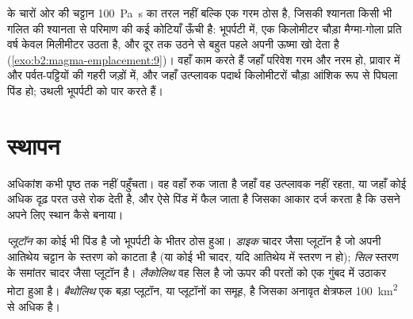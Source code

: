  के चारों ओर की चट्टान \qty{100}{Pa.s} का तरल नहीं बल्कि एक गरम ठोस है,
जिसकी श्यानता किसी भी गलित की श्यानता से परिमाण की कई कोटियाँ ऊँची है:
भूपर्पटी में, एक किलोमीटर चौड़ा मैग्मा-गोला प्रति वर्ष केवल मिलीमीटर उठता है, और
दूर तक उठने से बहुत पहले अपनी ऊष्मा खो देता है (\cref{exo:b2:magma-emplacement:9})। 
वहाँ काम करते हैं जहाँ परिवेश गरम और नरम हो, प्रावार में और पर्वत-पट्टियों की गहरी
जड़ों में, और जहाँ उत्प्लावक पदार्थ किलोमीटरों चौड़ा आंशिक रूप से पिघला पिंड हो;
उथली भूपर्पटी को  पार करते हैं।

\section{स्थापन}

अधिकांश  कभी पृष्ठ तक नहीं पहुँचता। वह वहाँ रुक जाता है जहाँ वह उत्प्लावक नहीं रहता,
या जहाँ कोई अधिक दृढ़ परत उसे रोक देती है, और ऐसे पिंड में फैल जाता है जिसका आकार
दर्ज करता है कि उसने अपने लिए स्थान कैसे बनाया।

\begin{definition}[अंतर्वेधी पिंड]\label{def:b2:magma-emplacement:bodies}
\emph{प्लूटॉन}  का कोई भी पिंड है जो
भूपर्पटी के भीतर ठोस हुआ। \emph{डाइक} चादर जैसा प्लूटॉन है जो अपनी आतिथेय चट्टान के
स्तरण को काटता है (या कोई भी चादर, यदि आतिथेय में स्तरण न हो);
\emph{सिल} स्तरण के समांतर चादर जैसा प्लूटॉन है।
\emph{लैकोलिथ} वह सिल है जो ऊपर की परतों को एक गुंबद में
उठाकर मोटा हुआ है। \emph{बैथोलिथ} एक बड़ा प्लूटॉन,
या प्लूटॉनों का समूह, है जिसका अनावृत क्षेत्रफल \qty{100}{km^2} से अधिक है।
\end{definition}

